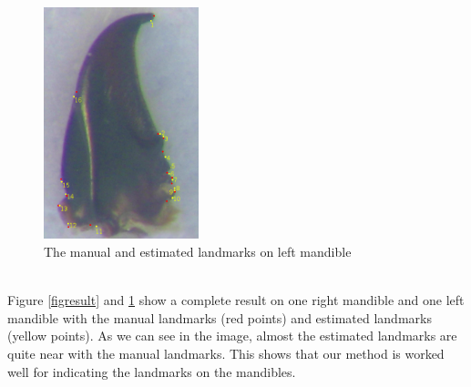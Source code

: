 \documentclass[twoside,twocolumn,10pt]{article}
\begin{document}
\begin{figure}[h]
\centering
\includegraphics[width=0.4\textwidth]{./images/mg_rs}
\caption{The manual and estimated landmarks on left mandible}
\label{figresult2}
\end{figure}~\\

Figure \ref{figresult} and \ref{figresult2} show a complete result on one right mandible and one left mandible with the manual landmarks (red points) and estimated landmarks (yellow points). As we can see in the image, almost the estimated landmarks are quite near with the manual landmarks. This shows that our method is worked well for indicating the landmarks on the mandibles.\\
\end{document}
